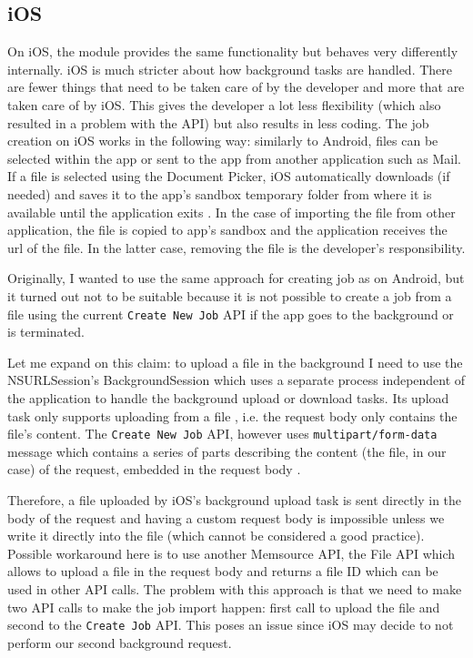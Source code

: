 \subsection{iOS}
On iOS, the module provides the same functionality but behaves very differently internally. iOS is much stricter about how background tasks are handled. There are fewer things that need to be taken care of by the developer and more that are taken care of by iOS. This gives the developer a lot less flexibility (which also resulted in a problem with the API) but also results in less coding. The job creation on iOS works in the following way: similarly to Android, files can be selected within the app or sent to the app from another application such as Mail. If a file is selected using the Document Picker, iOS automatically downloads (if needed) and saves it to the app’s sandbox temporary folder from where it is available until the application exits \cite{ios:filePicker}. In the case of importing the file from other application, the file is copied to app's sandbox and the application receives the url of the file. In the latter case, removing the file is the developer's responsibility.

Originally, I wanted to use the same approach for creating job as on Android, but it turned out not to be suitable because it is not possible to create a job from a file using the current \texttt{Create New Job} API if the app goes to the background or is terminated.

Let me expand on this claim: to upload a file in the background I need to use the NSURLSession's BackgroundSession which uses a separate process \cite{ios:bgConsiderations} independent of the application to handle the background upload or download tasks. Its upload task only supports uploading from a file \cite{ios:bgConsiderations}, i.e. the request body only contains the file's content. The \texttt{Create New Job} API, however uses \texttt{multipart/form-data} message which contains a series of parts describing the content (the file, in our case) of the request, embedded in the request body \cite{rfc2388}.  

Therefore, a file uploaded by iOS's background upload task is sent directly in the body of the request and having a custom request body is impossible unless we write it directly into the file (which cannot be considered a good practice). Possible workaround here is to use another Memsource API, the File API which allows to upload a file in the request body and returns a file ID which can be used in other API calls. The problem with this approach is that we need to make two API calls to make the job import happen: first call to upload the file and second to the \texttt{Create Job} API. This poses an issue since iOS may decide to not perform our second background request.

